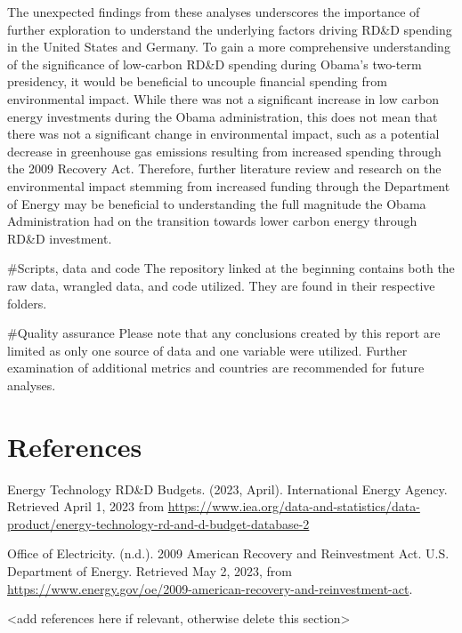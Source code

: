 \documentclass[
  12pt,
]{article}
\begin{document}
The unexpected findings from these analyses underscores the importance
of further exploration to understand the underlying factors driving
RD\&D spending in the United States and Germany. To gain a more
comprehensive understanding of the significance of low-carbon RD\&D
spending during Obama's two-term presidency, it would be beneficial to
uncouple financial spending from environmental impact. While there was
not a significant increase in low carbon energy investments during the
Obama administration, this does not mean that there was not a
significant change in environmental impact, such as a potential decrease
in greenhouse gas emissions resulting from increased spending through
the 2009 Recovery Act. Therefore, further literature review and research
on the environmental impact stemming from increased funding through the
Department of Energy may be beneficial to understanding the full
magnitude the Obama Administration had on the transition towards lower
carbon energy through RD\&D investment.

\newpage

\#Scripts, data and code The repository linked at the beginning contains
both the raw data, wrangled data, and code utilized. They are found in
their respective folders.

\#Quality assurance Please note that any conclusions created by this
report are limited as only one source of data and one variable were
utilized. Further examination of additional metrics and countries are
recommended for future analyses.

\newpage

\hypertarget{references}{%
\section{References}\label{references}}

Energy Technology RD\&D Budgets. (2023, April). International Energy
Agency. Retrieved April 1, 2023 from
\url{https://www.iea.org/data-and-statistics/data-product/energy-technology-rd-and-d-budget-database-2}

Office of Electricity. (n.d.). 2009 American Recovery and Reinvestment
Act. U.S. Department of Energy. Retrieved May 2, 2023, from
\url{https://www.energy.gov/oe/2009-american-recovery-and-reinvestment-act}.

\textless add references here if relevant, otherwise delete this
section\textgreater{}
\end{document}
